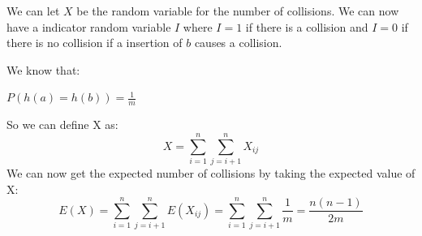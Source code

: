 \documentclass[12pt,letterpaper]{article}
\begin{document}
We can let $X$ be the random variable for the number of collisions.
We can now have a indicator random variable $I$ where $I=1$ if there is a collision and $I=0$ if there is no collision
if a insertion of $b$ causes a collision.

We know that:\\ 
\begin{center}
$P(h(a) = h(b)) = \frac{1}{m}$\\
\end{center}
So we can define X as:\\
\begin{equation}
    X = \sum_{i=1}^{n} \sum_{j=i+1}^{n} X_{ij}
\end{equation}
We can now get the expected number of collisions by taking the expected value of X:\\
\begin{equation}
    E(X) = \sum_{i=1}^{n} \sum_{j=i+1}^{n} E(X_{ij}) = \sum_{i=1}^{n} \sum_{j=i+1}^{n} \frac{1}{m} = \frac{n(n-1)}{2m}
\end{equation}
\end{document}
